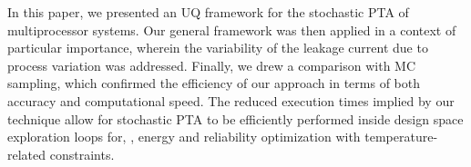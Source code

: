In this paper, we presented an UQ framework for the stochastic PTA of multiprocessor systems. Our general framework was then applied in a context of particular importance, wherein the variability of the leakage current due to process variation was addressed. Finally, we drew a comparison with MC sampling, which confirmed the efficiency of our approach in terms of both accuracy and computational speed. The reduced execution times implied by our technique allow for stochastic PTA to be efficiently performed inside design space exploration loops for, \eg, energy and reliability optimization with temperature-related constraints.

